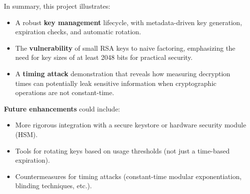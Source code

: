 \documentclass[12pt]{article}
\begin{document}
In summary, this project illustrates:
\begin{itemize}
    \item A robust \textbf{key management} lifecycle, with metadata-driven key generation, expiration checks, and automatic rotation.
    \item The \textbf{vulnerability} of small RSA keys to naive factoring, emphasizing the need for key sizes of at least 2048 bits for practical security.
    \item A \textbf{timing attack} demonstration that reveals how measuring decryption times can potentially leak sensitive information when cryptographic operations are not constant-time.
\end{itemize}

\noindent
\textbf{Future enhancements} could include:
\begin{itemize}
    \item More rigorous integration with a secure keystore or hardware security module (HSM).
    \item Tools for rotating keys based on usage thresholds (not just a time-based expiration).
    \item Countermeasures for timing attacks (constant-time modular exponentiation, blinding techniques, etc.).
\end{itemize}
\end{document}
